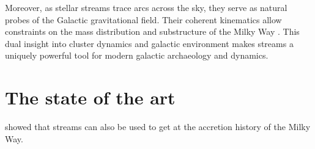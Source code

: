 \documentclass{article}
\begin{document}

    Moreover, as stellar streams trace arcs across the sky, they serve as natural probes of the Galactic gravitational field. Their coherent kinematics allow constraints on the mass distribution and substructure of the Milky Way \citep{2011MNRAS.417..198V,2023ApJ...954..195N}. This dual insight into cluster dynamics and galactic environment makes streams a uniquely powerful tool for modern galactic archaeology and dynamics.


\section{The state of the art}

\citet{2021ApJ...909L..26B} showed that streams can also be used to get at the accretion history of the Milky Way. 






\end{document}
